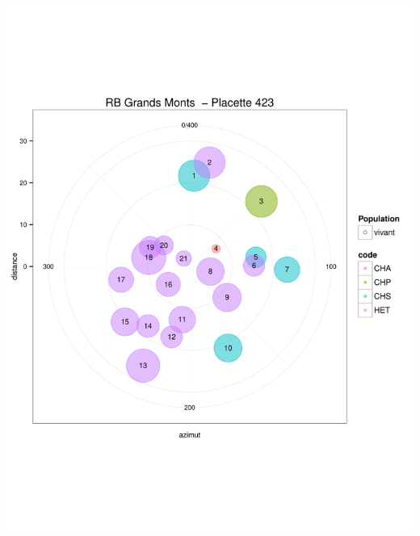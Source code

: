 \documentclass[a4paper]{book}\usepackage[]{graphicx}\usepackage[]{color}
\makeatletter
\def\maxwidth{ %
  \ifdim\Gin@nat@width>\linewidth
    \linewidth
  \else
    \Gin@nat@width
  \fi
}
\newenvironment{knitrout}{}{} %
\makeatother
\begin{document}
\begin{knitrout}
{\centering \includegraphics[width=\maxwidth]{Figures/PlanArbres-38} 

}





\end{knitrout}
\end{document}
